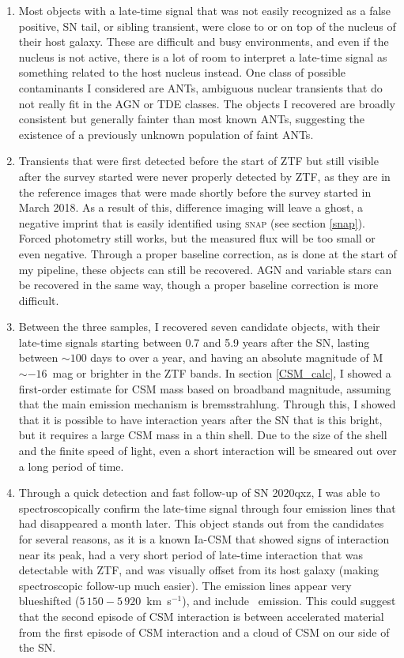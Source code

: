 \documentclass[a4paper,oneside,12pt, class=Latex/Classes/PhDthesisPSnPDF, crop=false]{standalone}
\begin{document}
\begin{enumerate}
	\item Most objects with a late-time signal that was not easily recognized as a false positive, SN tail, or sibling transient, were close to or on top of the nucleus of their host galaxy. These are difficult and busy environments, and even if the nucleus is not active, there is a lot of room to interpret a late-time signal as something related to the host nucleus instead. One class of possible contaminants I considered are ANTs, ambiguous nuclear transients that do not really fit in the AGN or TDE classes. The objects I recovered are broadly consistent but generally fainter than most known ANTs, suggesting the existence of a previously unknown population of faint ANTs.
	\item Transients that were first detected before the start of ZTF but still visible after the survey started were never properly detected by ZTF, as they are in the reference images that were made shortly before the survey started in March 2018. As a result of this, difference imaging will leave a ghost, a negative imprint that is easily identified using \textsc{snap} (see section \ref{snap}). Forced photometry still works, but the measured flux will be too small or even negative. Through a proper baseline correction, as is done at the start of my pipeline, these objects can still be recovered. AGN and variable stars can be recovered in the same way, though a proper baseline correction is more difficult.
	\item Between the three samples, I recovered seven candidate objects, with their late-time signals starting between 0.7 and 5.9 years after the SN, lasting between $\sim100$ days to over a year, and having an absolute magnitude of M~$\sim-16$~mag or brighter in the ZTF bands. In section \ref{CSM_calc}, I showed a first-order estimate for CSM mass based on broadband magnitude, assuming that the main emission mechanism is bremsstrahlung. Through this, I showed that it is possible to have interaction years after the SN that is this bright, but it requires a large CSM mass in a thin shell. Due to the size of the shell and the finite speed of light, even a short interaction will be smeared out over a long period of time.
	\item Through a quick detection and fast follow-up of SN 2020qxz, I was able to spectroscopically confirm the late-time signal through four emission lines that had disappeared a month later. This object stands out from the candidates for several reasons, as it is a known Ia-CSM that showed signs of interaction near its peak, had a very short period of late-time interaction that was detectable with ZTF, and was visually offset from its host galaxy (making spectroscopic follow-up much easier). The emission lines appear very blueshifted ($5\,150 - 5\,920$~km~s$^{-1}$), and include \Hbeta\ emission. This could suggest that the second episode of CSM interaction is between accelerated material from the first episode of CSM interaction and a cloud of CSM on our side of the SN.

\end{enumerate}
\end{document}
